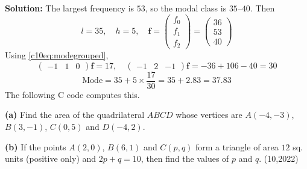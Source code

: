 \textbf{Solution:} The largest frequency is $53$, so the modal class is $35$--$40$. Then
\begin{equation}
l = 35, \quad h = 5, \quad
\mathbf{f} = \begin{pmatrix} f_0 \\ f_1 \\ f_2 \end{pmatrix} = \begin{pmatrix} 36 \\ 53 \\ 40 \end{pmatrix}
\end{equation}
Using \eqref{c10eq:modegrouped},
\begin{equation}
\begin{pmatrix} -1 & 1 & 0 \end{pmatrix}\mathbf{f} = 17, \quad
\begin{pmatrix} -1 & 2 & -1 \end{pmatrix}\mathbf{f} = -36 + 106 - 40 = 30
\end{equation}
\begin{equation}
\text{Mode} = 35 + 5 \times \frac{17}{30} = 35 + 2.83 = 37.83
\end{equation}
The following C code computes this.

\nopagebreak[4]
\begin{center}
\end{center}


\clearpage
\item \textbf{(a)} Find the area of the quadrilateral $ABCD$ whose vertices are $A(-4, -3)$, $B(3, -1)$, $C(0, 5)$ and $D(-4, 2)$.

\textbf{(b)} If the points $A(2, 0)$, $B(6, 1)$ and $C(p, q)$ form a triangle of area $12$ sq. units (positive only) and $2p + q = 10$, then find the values of $p$ and $q$. \hfill (10,2022)

